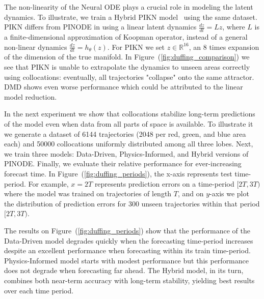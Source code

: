 The non-linearity of the Neural ODE plays a crucial role in modeling the latent dynamics. To illustrate, we train a Hybrid PIKN model~\cite{liu2022physics} using the same dataset. PIKN differs from PINODE in using a linear latent dynamics $\frac{dz}{dt} = Lz$, where $L$ is a finite-dimensional approximation of Koopman operator, instead of a general non-linear dynamics $\frac{dz}{dt} = h_\theta(z)$. For PIKN we set $z \in \mathbb{R}^{16}$, an 8 times expansion of the dimension of the true manifold. In Figure~(\ref{fig:duffing_comparison}) we see that PIKN is unable to extrapolate the dynamics to unseen areas correctly using collocations: eventually, all trajectories "collapse" onto the same attractor. DMD shows even worse performance which could be attributed to the linear model reduction.

In the next experiment we show that collocations stabilize long-term predictions of the model even when data from all parts of space is available. To illustrate it we generate a dataset of 6144 trajectories (2048 per red, green, and blue area each) and 50000 collocations uniformly distributed among all three lobes. Next, we train three models: Data-Driven, Physics-Informed, and Hybrid versions of PINODE. Finally, we evaluate their relative performance for ever-increasing forecast time. In Figure~(\ref{fig:duffing_periods}), the x-axis represents test time-period. For example, $x = 2T$ represents prediction errors on a time-period $[2T, 3T)$ where the model was trained on trajectories of length $T$, and on $y$-axis we plot the distribution of prediction errors for 300 unseen trajectories within that period $[2T, 3T)$.

The results on Figure~(\ref{fig:duffing_periods}) show that the performance of the Data-Driven model degrades quickly when the forecasting time-period increases despite an excellent performance when forecasting within its train time-period. Physics-Informed model starts with modest performance but this performance does not degrade when forecasting far ahead. The Hybrid model, in its turn, combines both near-term accuracy with long-term stability, yielding best results over each time period. 

